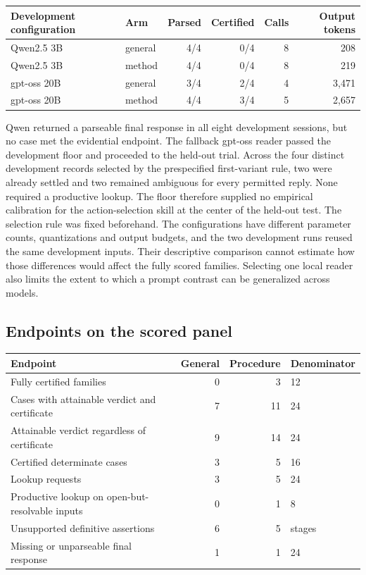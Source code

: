 \documentclass[12pt,letterpaper]{article}
\begin{document}
\begin{center}\footnotesize\setlength{\tabcolsep}{4pt}\begin{tabularx}{\linewidth}{YYrrrr}\toprule
Development configuration & Arm & Parsed & Certified & Calls & Output tokens\\\midrule
Qwen2.5 3B & general & 4/4 & 0/4 & 8 & 208\\
Qwen2.5 3B & method & 4/4 & 0/4 & 8 & 219\\
gpt-oss 20B & general & 3/4 & 2/4 & 4 & 3,471\\
gpt-oss 20B & method & 4/4 & 3/4 & 5 & 2,657\\
\bottomrule\end{tabularx}\end{center}


Qwen returned a parseable final response in all eight development sessions, but no case met the evidential endpoint. The fallback gpt-oss reader passed the development floor and proceeded to the held-out trial. Across the four distinct development records selected by the prespecified first-variant rule, two were already settled and two remained ambiguous for every permitted reply. None required a productive lookup. The floor therefore supplied no empirical calibration for the action-selection skill at the center of the held-out test. The selection rule was fixed beforehand. The configurations have different parameter counts, quantizations and output budgets, and the two development runs reused the same development inputs. Their descriptive comparison cannot estimate how those differences would affect the fully scored families. Selecting one local reader also limits the extent to which a prompt contrast can be generalized across models.

\subsection{Endpoints on the scored panel}

\begin{center}\footnotesize\setlength{\tabcolsep}{4pt}\begin{tabularx}{\linewidth}{Yrrl}\toprule
Endpoint & General & Procedure & Denominator\\\midrule
Fully certified families & 0 & 3 & 12\\
Cases with attainable verdict and certificate & 7 & 11 & 24\\
Attainable verdict regardless of certificate & 9 & 14 & 24\\
Certified determinate cases & 3 & 5 & 16\\
Lookup requests & 3 & 5 & 24\\
Productive lookup on open-but-resolvable inputs & 0 & 1 & 8\\
Unsupported definitive assertions & 6 & 5 & stages\\
Missing or unparseable final response & 1 & 1 & 24\\
\bottomrule\end{tabularx}\end{center}
\end{document}
